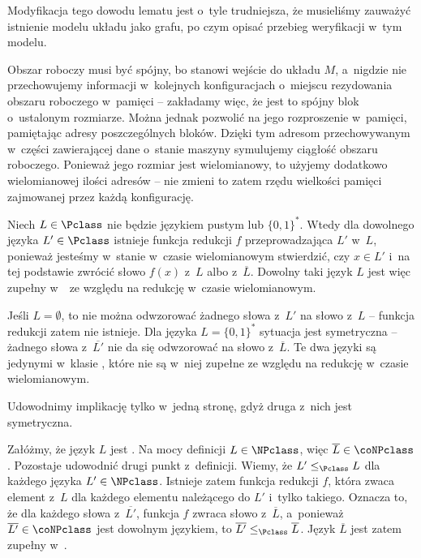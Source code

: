 Modyfikacja tego dowodu lematu jest o~tyle trudniejsza, że musieliśmy zauważyć istnienie modelu układu jako grafu, po czym opisać przebieg weryfikacji w~tym modelu.

\exercise %
Obszar roboczy musi być spójny, bo stanowi wejście do układu $M$, a~nigdzie nie przechowujemy informacji w~kolejnych konfiguracjach o~miejscu rezydowania obszaru roboczego w~pamięci -- zakładamy więc, że jest to spójny blok o~ustalonym rozmiarze.
Można jednak pozwolić na jego rozproszenie w~pamięci, pamiętając adresy poszczególnych bloków.
Dzięki tym adresom przechowywanym w~części zawierającej dane o~stanie maszyny symulujemy ciągłość obszaru roboczego.
Ponieważ jego rozmiar jest wielomianowy, to użyjemy dodatkowo wielomianowej ilości adresów -- nie zmieni to zatem rzędu wielkości pamięci zajmowanej przez każdą konfigurację.

\exercise %
Niech $L\in\Pclass$ nie będzie językiem pustym lub $\{0,1\}^*$.
Wtedy dla dowolnego języka $L'\in\Pclass$ istnieje funkcja redukcji $f$ przeprowadzająca $L'$ w~$L$, ponieważ jesteśmy w~stanie w~czasie wielomianowym stwierdzić, czy $x\in L'$ i~na tej podstawie zwrócić słowo $f(x)$ z~$L$ albo z~$\overline{L}$.
Dowolny taki język $L$ jest więc zupełny w~\Pclass\ ze względu na redukcję w~czasie wielomianowym.

Jeśli $L=\emptyset$, to nie można odwzorować żadnego słowa z~$L'$ na słowo z~$L$ -- funkcja redukcji zatem nie istnieje.
Dla języka $L=\{0,1\}^*$ sytuacja jest symetryczna -- żadnego słowa z~$\overline{L'}$ nie da się odwzorować na słowo z~$\overline{L}$.
Te dwa języki są jedynymi w~klasie \Pclass, które nie są w~niej zupełne ze względu na redukcję w~czasie wielomianowym.

\exercise %
Udowodnimy implikację tylko w~jedną stronę, gdyż druga z~nich jest symetryczna.

Załóżmy, że język $L$ jest .
Na mocy definicji  $L\in\NPclass$, więc $\overline{L}\in\coNPclass$.
Pozostaje udowodnić drugi punkt z~definicji.
Wiemy, że $L'\le_\Pclass L$ dla każdego języka $L'\in\NPclass$.
Istnieje zatem funkcja redukcji $f$, która zwaca element z~$L$ dla każdego elementu należącego do $L'$ i~tylko takiego.
Oznacza to, że dla każdego słowa z~$\overline{L'}$, funkcja $f$ zwraca słowo z~$\overline{L}$, a~ponieważ $\overline{L'}\in\coNPclass$ jest dowolnym językiem, to $\overline{L'}\le_\Pclass\overline{L}$.
Język $\overline{L}$ jest zatem zupełny w~\coNPclass.

\exercise %
